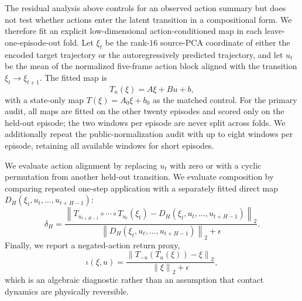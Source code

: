 \documentclass{article}
\begin{document}
The residual analysis above controls for an observed action summary but does
not test whether actions enter the latent transition in a compositional form.
We therefore fit an explicit low-dimensional action-conditioned map in each
leave-one-episode-out fold. Let $\xi_t$ be the rank-$16$ source-PCA coordinate
of either the encoded target trajectory or the autoregressively predicted
trajectory, and let $u_t$ be the mean of the normalized five-frame action block
aligned with the transition $\xi_t\to\xi_{t+1}$. The fitted map is
\begin{equation}
T_u(\xi)=A\xi+Bu+b,
\label{eq:supp-action-map}
\end{equation}
with a state-only map $T(\xi)=A_0\xi+b_0$ as the matched control. For the
primary audit, all maps are fitted on the other twenty episodes and scored
only on the held-out episode; the two windows per episode are never split
across folds. We additionally repeat the public-normalization audit with up
to eight windows per episode, retaining all available windows for short
episodes.

We evaluate action alignment by replacing $u_t$ with zero or with a cyclic
permutation from another held-out transition. We evaluate composition by
comparing repeated one-step application with a separately fitted direct map
$D_H(\xi_t,u_t,\ldots,u_{t+H-1})$:
\begin{equation}
\delta_H=\frac{\left\lVert
T_{u_{t+H-1}}\circ\cdots\circ T_{u_t}(\xi_t)
-D_H(\xi_t,u_t,\ldots,u_{t+H-1})\right\rVert_2}
{\left\lVert D_H(\xi_t,u_t,\ldots,u_{t+H-1})\right\rVert_2+\epsilon}.
\label{eq:supp-action-composition-defect}
\end{equation}
Finally, we report a negated-action return proxy,
\begin{equation}
\iota(\xi,u)=
\frac{\left\lVert T_{-u}(T_u(\xi))-\xi\right\rVert_2}
{\left\lVert\xi\right\rVert_2+\epsilon},
\label{eq:supp-action-inverse-proxy}
\end{equation}
which is an algebraic diagnostic rather than an assumption that contact
dynamics are physically reversible.

\begin{table}[H]
\centering
\scriptsize
\setlength{\tabcolsep}{3pt}
\caption{Cross-fitted action-alignment diagnostics on the external PushT
validation trajectories. Entries are means with 95\% episode-bootstrap
intervals. ``Action gain'' is state-only MSE minus action-conditioned MSE;
``permuted penalty'' is permuted-action MSE minus observed-action MSE.}
\label{tab:supp-action-algebra-alignment}
\end{table}
\end{document}
